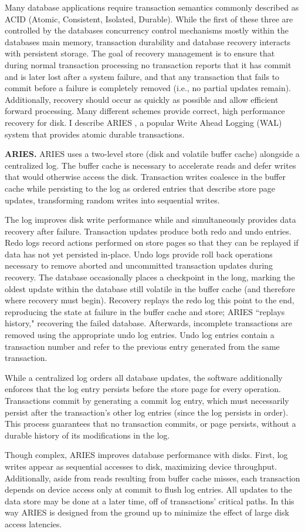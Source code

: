 Many database applications require transaction semantics commonly described as ACID (Atomic, Consistent, Isolated, Durable).
While the first of these three are controlled by the databases concurrency control mechanisms mostly within the databases main memory, transaction durability and database recovery interacts with persistent storage.
The goal of recovery management is to ensure that during normal transaction processing no transaction reports that it has commit and is later lost after a system failure, and that any transaction that fails to commit before a failure is completely removed (i.e., no partial updates remain).
Additionally, recovery should occur as quickly as possible and allow efficient forward processing.
Many different schemes provide correct, high performance recovery for disk.
I describe ARIES \cite{MohanHaderle92}, a popular Write Ahead Logging (WAL) system that provides atomic durable transactions.

\textbf{ARIES.}
ARIES uses a two-level store (disk and volatile buffer cache) alongside a centralized log.
The buffer cache is necessary to accelerate reads and defer writes that would otherwise access the disk.
Transaction writes coalesce in the buffer cache while persisting to the log as ordered entries that describe store page updates, transforming random writes into sequential writes.

The log improves disk write performance while and simultaneously provides data recovery after failure.
Transaction updates produce both redo and undo entries.
Redo logs record actions performed on store pages so that they can be replayed if data has not yet persisted in-place.
Undo logs provide roll back operations necessary to remove aborted and uncommitted transaction updates during recovery.
The database occasionally places a checkpoint in the long, marking the oldest update within the database still volatile in the buffer cache (and therefore where recovery must begin).
Recovery replays the redo log this point to the end, reproducing the state at failure in the buffer cache and store; ARIES ``replays history," recovering the failed database.
Afterwards, incomplete transactions are removed using the appropriate undo log entries.
Undo log entries contain a transaction number and refer to the previous entry generated from the same transaction.

While a centralized log orders all database updates, the software additionally enforces that the log entry persists before the store page for every operation.
Transactions commit by generating a commit log entry, which must necessarily persist after the transaction's other log entries (since the log persists in order).
This process guarantees that no transaction commits, or page persists, without a durable history of its modifications in the log.

Though complex, ARIES improves database performance with disks.
First, log writes appear as sequential accesses to disk, maximizing device throughput.
Additionally, aside from reads resulting from buffer cache misses, each transaction depends on device access only at commit to flush log entries.
All updates to the data store may be done at a later time, off of transactions' critical paths.
In this way ARIES is designed from the ground up to minimize the effect of large disk access latencies.
